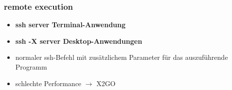 \begin{frame}
\frametitle{remote execution}
\begin{itemize}
	\item \textbf{ssh server Terminal-Anwendung}
	\pause
	\item \textbf{ssh -X server Desktop-Anwendungen}
	\pause
	\item normaler ssh-Befehl mit zusätzlichem Parameter für das auszuführende Programm
	\pause
	\item schlechte Performance $\rightarrow$ X2GO
\end{itemize}
\end{frame}